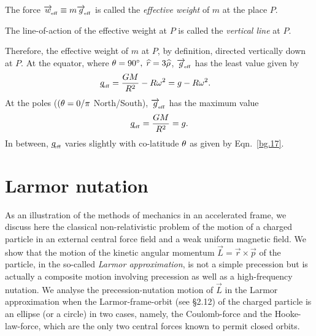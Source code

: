 \dfn The force $\overrightarrow{w}_{_{\hspace*{-1.5pt}{\text{eff}}}}\equiv 
m\overrightarrow{g}_{_{\hspace*{-1.5pt}{\text{eff}}}}$ is called the \textsl{effective 
weight} of $m$ at the place $P$.

\dfn The line-of-action of the effective weight at $P$ is
called the \textsl{vertical line}  at $P$.

Therefore, the {effective weight} of $m$ at $P$, by 
definition, directed {vertically down} at $P$. At the 
equator, where ${\theta} =90^\circ,\; {\widehat{r}} =3{\widehat{\rho}}$, 
$\overrightarrow{g}_{_{\hspace*{-1.5pt}{\text{eff}}}}$ has the {least value} given by
\begin{align}
g_{_{\hspace*{-1.5pt}{\text{eff}}}}&=\frac{GM}{R^2}-R {\omega}^2 
=g-R {\omega}^2.
\end{align}
At the poles ($({\theta} =0/\pi$ North/South),
$\overrightarrow{g}_{_{\hspace*{-1.5pt}{\text{eff}}}}$ has the {maximum value}
\begin{align}
g_{_{\hspace*{-1.5pt}{\text{eff}}}}=\frac{GM}{R^2}=g.
\end{align}
In between, $g_{_{\hspace*{-1.5pt}{\text{eff}}}}$ varies slightly with
co-latitude ${\theta}$ as given by  Eqn.~\break\eqref{bg.17}.

\vspace{-.2cm}
\section{Larmor nutation}
 


As an illustration of the methods of mechanics in an 
accelerated frame,  we discuss here the classical 
non-relativistic problem of the motion of a charged 
particle 
in an external central force field and a weak uniform 
magnetic field. We show that the motion of the kinetic 
angular momentum $\vec{L} = \vec{r}\times\vec{p}$ of the 
particle, in the so-called \textsl{Larmor approximation}, 
 is not a simple precession but 
is actually a composite motion involving precession as well 
as a high-frequency nutation. We analyse the 
precession-nutation motion of $\vec{L}$ in the Larmor 
approximation when the Larmor-frame-orbit (see \S2.12) of 
the charged particle is an ellipse (or a circle) in two 
cases, namely, the Coulomb-force and the Hooke-law-force, 
which are the only two central forces known to permit 
closed orbits. 


